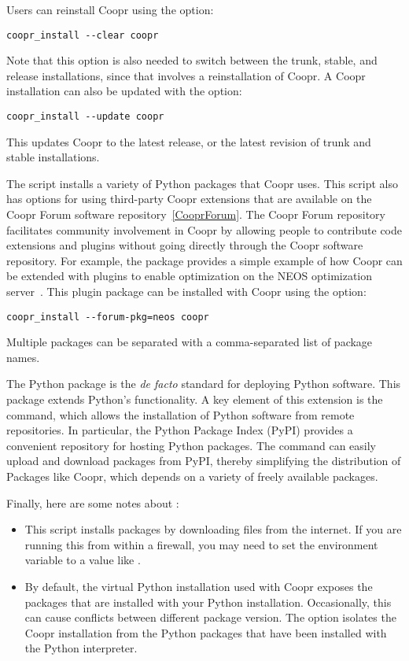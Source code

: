 Users can reinstall Coopr using the  option:
\begin{lstlisting}
coopr_install --clear coopr
\end{lstlisting}
Note that this option is also needed to switch between the trunk, stable, and release
installations, since that involves a reinstallation of Coopr.  A Coopr installation can also be updated with the  option:
\begin{lstlisting}
coopr_install --update coopr
\end{lstlisting}
This updates Coopr to the latest release, or the latest revision of trunk and
stable installations.

The  script installs a variety of Python packages
that Coopr uses.  This script also has options for using third-party Coopr
extensions that are available on the Coopr Forum software repository~\ref{CooprForum}.
The Coopr Forum repository facilitates community involvement in Coopr
by allowing people to contribute code extensions and plugins without
going directly through the Coopr software repository.  For example,
the  package provides a simple example of how
Coopr can be extended with plugins to enable optimization on the NEOS
optimization server~\cite{NEOS}.  This plugin package can be installed with
Coopr using the  option:
\begin{lstlisting}
coopr_install --forum-pkg=neos coopr
\end{lstlisting}
Multiple packages can be separated with a comma-separated list of package names.

The Python  package is the \textit{de facto}
standard for deploying Python software.  This package extends Python's
 functionality.  A key element of this extension is the
 command, which allows the installation of Python
software from remote repositories.  In particular, the Python Package
Index (PyPI) provides a convenient repository for hosting Python packages.
The  command can easily upload and download packages
from PyPI, thereby simplifying the distribution of Packages like Coopr,
which depends on a variety of freely available packages.

Finally, here are some notes about :
\begin{itemize}

\item This script installs packages by downloading files from
the internet.  If you are running this from within a firewall, you
may need to set the  environment variable to a value like
.

\item By default, the virtual Python installation used with Coopr
exposes the packages that are installed with your Python installation.
Occasionally, this can cause conflicts between different package version.
The  option isolates the Coopr installation from
the Python packages that have been installed with the Python interpreter.

\end{itemize}


